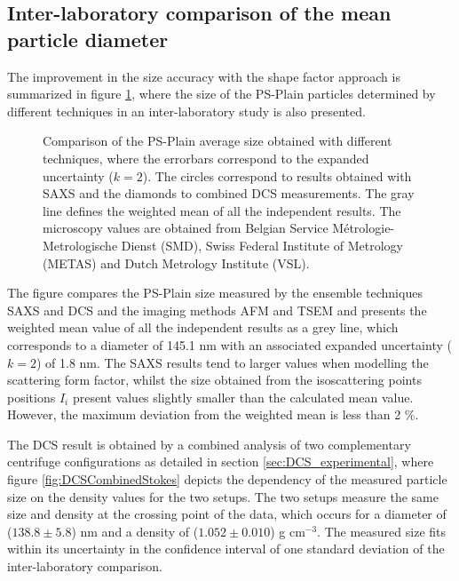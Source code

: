 \subsection{Inter-laboratory comparison of the mean particle diameter}
\label{sec:interlab_size_comparison}
The improvement in the size accuracy with the shape factor approach is summarized in figure \ref{fig:PSPlainSizeComparison}, where the size of the PS-Plain particles determined by different techniques in an inter-laboratory study is also presented\citep{nicolet_inter-laboratory_2016}.

\begin{figure}
	\centering
		
	\caption{Comparison of the PS-Plain average size obtained with different techniques, where the errorbars correspond to the expanded uncertainty ($k=2$). The circles correspond to results obtained with SAXS and the diamonds to combined DCS measurements. The gray line defines the weighted mean of all the independent results. The microscopy values are obtained from Belgian Service Métrologie-Metrologische Dienst (SMD), Swiss Federal Institute of Metrology (METAS) and Dutch Metrology Institute (VSL).}
	\label{fig:PSPlainSizeComparison}
\end{figure}

The figure compares the PS-Plain size measured by the ensemble techniques SAXS and DCS and the imaging methods AFM and TSEM and presents the weighted mean value of all the independent results as a grey line, which corresponds to a diameter of 145.1 nm with an associated expanded uncertainty ($k=2$) of 1.8 nm. The SAXS results tend to larger values when modelling the scattering form factor, whilst the size obtained from the isoscattering points positions $I_i$ present values slightly smaller than the calculated mean value. However, the maximum deviation from the weighted mean is less than 2 $\%$.

The DCS result is obtained by a combined analysis of two complementary centrifuge configurations as detailed in section \ref{sec:DCS_experimental}, where figure \ref{fig:DCSCombinedStokes} depicts the dependency of the measured particle size on the density values for the two setups. The two setups measure the same size and density at the crossing point of the data, which occurs for a diameter of ($138.8\pm5.8$) nm and a density of ($1.052\pm0.010$) g cm$^{-3}$. The measured size fits within its uncertainty in the confidence interval of one standard deviation of the inter-laboratory comparison.

